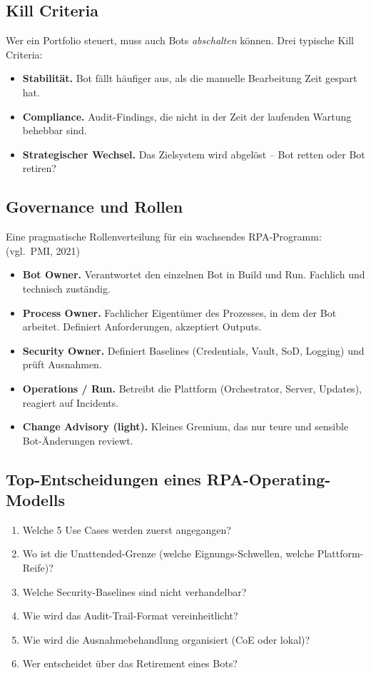 \documentclass[11pt,a4paper,oneside]{article}
\newcommand{\fachbegriff}[1]{\textbf{#1}}
\newcommand{\quelle}[1]{{\footnotesize\color{lpGray}(#1)}}
\begin{document}
\subsection{Kill Criteria}

Wer ein Portfolio steuert, muss auch Bots \emph{abschalten} können. Drei typische Kill Criteria:

\begin{itemize}
  \item \textbf{Stabilität.} Bot fällt häufiger aus, als die manuelle Bearbeitung Zeit gespart hat.
  \item \textbf{Compliance.} Audit-Findings, die nicht in der Zeit der laufenden Wartung behebbar sind.
  \item \textbf{Strategischer Wechsel.} Das Zielsystem wird abgelöst -- Bot retten oder Bot retiren?
\end{itemize}

\subsection{Governance und Rollen}

Eine pragmatische Rollenverteilung für ein wachsendes RPA-Programm: \quelle{vgl.\ PMI, 2021}

\begin{itemize}
  \item \fachbegriff{Bot Owner.} Verantwortet den einzelnen Bot in Build und Run. Fachlich und technisch zuständig.
  \item \fachbegriff{Process Owner.} Fachlicher Eigentümer des Prozesses, in dem der Bot arbeitet. Definiert Anforderungen, akzeptiert Outputs.
  \item \fachbegriff{Security Owner.} Definiert Baselines (Credentials, Vault, SoD, Logging) und prüft Ausnahmen.
  \item \fachbegriff{Operations / Run.} Betreibt die Plattform (Orchestrator, Server, Updates), reagiert auf Incidents.
  \item \fachbegriff{Change Advisory (light).} Kleines Gremium, das nur teure und sensible Bot-Änderungen reviewt.
\end{itemize}

\subsection{Top-Entscheidungen eines RPA-Operating-Modells}

\begin{enumerate}
  \item Welche 5 Use Cases werden zuerst angegangen?
  \item Wo ist die Unattended-Grenze (welche Eignungs-Schwellen, welche Plattform-Reife)?
  \item Welche Security-Baselines sind nicht verhandelbar?
  \item Wie wird das Audit-Trail-Format vereinheitlicht?
  \item Wie wird die Ausnahmebehandlung organisiert (CoE oder lokal)?
  \item Wer entscheidet über das Retirement eines Bots?
\end{enumerate}
\end{document}
